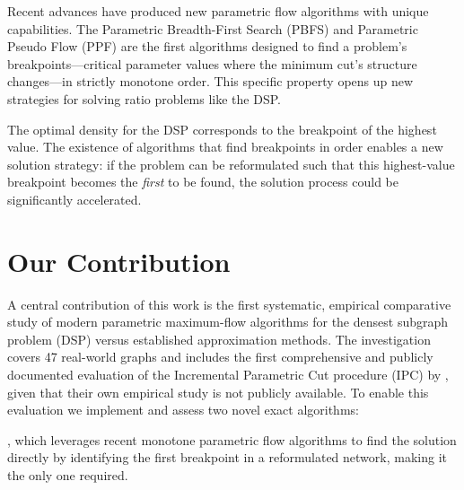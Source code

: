 Recent advances have produced new parametric flow algorithms with unique capabilities.
The Parametric Breadth-First Search (PBFS) \parencite{beines_simpler_2024} and Parametric Pseudo Flow (PPF) \parencite{Sauer_PPF_2025}
are the first algorithms designed to find a problem's breakpoints—critical parameter values where the minimum cut's structure changes—in strictly monotone order.
This specific property opens up new strategies for solving ratio problems like the DSP.

The optimal density for the DSP corresponds to the breakpoint of the highest value.
The existence of algorithms that find breakpoints in order enables a new solution strategy:
if the problem can be reformulated such that this highest-value breakpoint becomes the \textit{first} to be found, the solution process could be significantly accelerated.

\section[Our Contribution]{Our Contribution}\label{sec:our-contribution}


A central contribution of this work is the first systematic, empirical comparative study of modern parametric maximum-flow algorithms for the densest subgraph problem (DSP)
versus established approximation methods. The investigation covers 47 real-world graphs and includes the first comprehensive and publicly documented evaluation of the
Incremental Parametric Cut procedure (IPC) by \textcite{hochbaum_flow_2024}, given that their own empirical study is not publicly available.
To enable this evaluation we implement and assess two novel exact algorithms:

\textbf{{\DSPwithFBA}}, which leverages recent monotone parametric flow algorithms to find the solution directly by identifying the first breakpoint in a reformulated network, making it the only one required.

